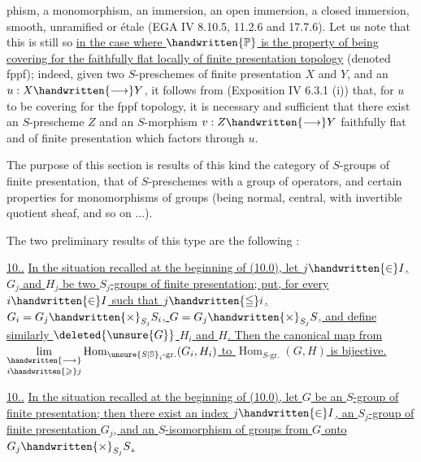 %
%
phism, a monomorphism, an immersion, an open immersion, a closed immersion, smooth, unramified or étale (EGA IV 8.10.5, 11.2.6 and 17.7.6). Let us note that this is still so  \uline{in the case where $\handwritten{\mathbb{P}}$ is the property of being covering for the faithfully flat locally of finite presentation topology} (denoted fppf); indeed, given two $S$-preschemes of finite presentation $X$ and $Y$, and an  $u:X\handwritten{\longrightarrow}Y$, it follows from (Exposition IV 6.3.1 (i))\deleted{,} that, for $u$ to be covering for the fppf topology, it is necessary and sufficient that there exist an $S$-prescheme $Z$ and an $S$-morphism $v:Z\handwritten{\longrightarrow}Y$ faithfully flat and of finite presentation which factors through $u$.

The purpose of this section is  results of this kind  the category of $S$-groups of finite presentation,  that of $S$-preschemes with a group of operators, and  certain properties for monomorphisms of groups (being normal, central, with invertible quotient sheaf, and so on ...).

The two preliminary results of this type are the following :

\uline{10..}  \uline{In the situation recalled at the beginning of (10.0), let  $j\handwritten{\in}I$, $G_j$ and $H_j$ be two $S_j$-groups of finite presentation; put, for every $i\handwritten{\in}I$ such that $j\handwritten{\leqq}i$, $G_i=G_j\handwritten{\times}_{S_j}S_i$, $G=G_j\handwritten{\times}_{S_j}S$, and define similarly $\deleted{\unsure{G}}$ $H_i$ and $H$. Then the canonical map from $\underset{i\handwritten{\geqslant}j}{\underset{\handwritten{\longrightarrow}}{\lim}}\operatorname{Hom}_{\unsure{S|\mathbb{S}}_i\text{-gr.}}(G_i,H_i)$ to $\operatorname{Hom}_{S\text{-gr.}}(G,H)$ is bijective.}

\uline{10..}  \uline{In the situation recalled at the beginning of (10.0), let $G$ be an $S$-group of finite presentation; then there exist an index $j\handwritten{\in}I$,  an $S_j$-group of  finite presentation $G_j$, and an  $S$-isomorphism of groups from $G$ onto $G_j\handwritten{\times}_{S_j}S$.}

